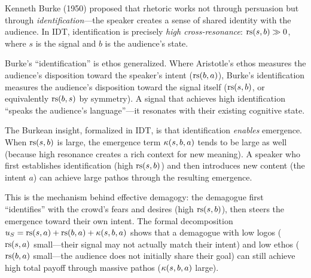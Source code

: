 \begin{remark}
\label{rem:burke-identification}
Kenneth Burke (1950) proposed that rhetoric works not through persuasion
but through \emph{identification}---the speaker creates a sense of shared
identity with the audience.  In IDT, identification is precisely
\emph{high cross-resonance}: $\mathrm{rs}(s, b) \gg 0$, where $s$ is the signal and
$b$ is the audience's state.

Burke's ``identification'' is ethos generalized.  Where Aristotle's ethos
measures the audience's disposition toward the speaker's intent
($\mathrm{rs}(b, a)$), Burke's identification measures the audience's disposition
toward the signal itself ($\mathrm{rs}(s, b)$, or equivalently $\mathrm{rs}(b, s)$ by
symmetry).  A signal that achieves high identification ``speaks the
audience's language''---it resonates with their existing cognitive state.

The Burkean insight, formalized in IDT, is that identification \emph{enables}
emergence.  When $\mathrm{rs}(s, b)$ is large, the emergence term $\kappa(s, b, a)$
tends to be large as well (because high resonance creates a rich context
for new meaning).  A speaker who first establishes identification (high
$\mathrm{rs}(s, b)$) and then introduces new content (the intent $a$) can achieve
large pathos through the resulting emergence.

This is the mechanism behind effective demagogy: the demagogue first
``identifies'' with the crowd's fears and desires (high $\mathrm{rs}(s, b)$), then
steers the emergence toward their own intent.  The formal decomposition
$u_S = \mathrm{rs}(s, a) + \mathrm{rs}(b, a) + \kappa(s, b, a)$ shows that a demagogue
with low logos ($\mathrm{rs}(s, a)$ small---their signal may not actually match
their intent) and low ethos ($\mathrm{rs}(b, a)$ small---the audience does not
initially share their goal) can still achieve high total payoff through
massive pathos ($\kappa(s, b, a)$ large).
\end{remark}

